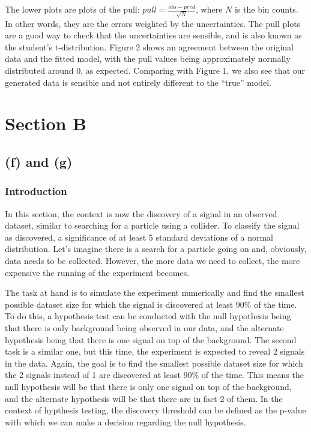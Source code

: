 \documentclass[12pt]{report} %
\begin{document}
\newpage

The lower plots are plots of the pull: $pull = \frac{obs - pred}{\sqrt{N}}$, where $N$ is the bin counts. In other words, they are the errors weighted by the uncertainties. The pull plots are a good way to check that the uncertainties are sensible, and is also known as the student's t-distribution\cite{Haslwanter2022}. Figure 2 shows an agreement between the original data and the fitted model, with the pull values being approximately normally distributed around 0, as expected. Comparing with Figure 1, we also see that our generated data is sensible and not entirely different to the ``true'' model.


\section*{Section B}

\subsection*{(f) and (g)}

\subsubsection*{Introduction}
In this section, the context is now the discovery of a signal in an observed dataset, similar to searching for a particle using a collider\cite{kenzie2014properties}. To classify the signal as discovered, a significance of at least 5 standard deviations of a normal distribution. Let's imagine there is a search for a particle going on and, obviously, data needs to be collected. However, the more data we need to collect, the more expensive the running of the experiment becomes.  

The task at hand is to simulate the experiment numerically and find the smallest possible dataset size for which the signal is discovered at least 90\% of the time. To do this, a hypothesis test can be conducted with the null hypothesis being that there is only background being observed in our data, and the alternate hypothesis being that there is one signal on top of the background\cite[p. 164]{Wass}. The second task is a similar one, but this time, the experiment is expected to reveal 2 signals in the data. Again, the goal is to find the smallest possible dataset size for which the 2 signals instead of 1 are discovered at least 90\% of the time. This means the null hypothesis will be that there is only one signal on top of the background, and the alternate hypothesis will be that there are in fact 2 of them. In the context of hypthesis testing, the discovery threshold can be defined as the p-value with which we can make a decision regarding the null hypothesis\cite[p. 164]{Wass}.
\end{document}
